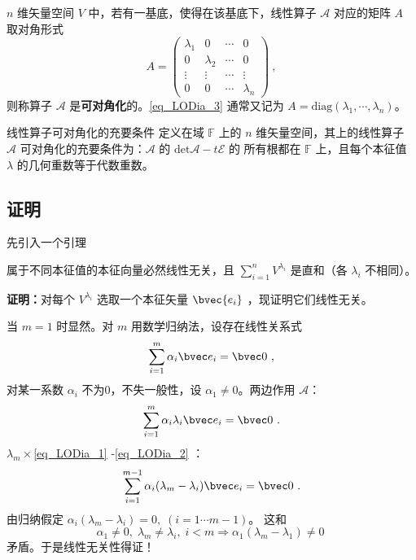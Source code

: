 \begin{definition}{}
 $n$ 维矢量空间 $V$ 中，若有一基底，使得在该基底下，线性算子 $\mathcal{A}$ 对应的矩阵 $A$ 取对角形式
 \begin{equation}\label{eq_LODia_3}
 A=\begin{pmatrix}
 \lambda_1&0&\cdots&0\\
 0&\lambda_2&\cdots&0\\
 \vdots&\vdots&\cdots&\vdots\\
 0&0&\cdots&\lambda_n
 \end{pmatrix}~,
 \end{equation}
 则称算子 $\mathcal{A}$ 是\textbf{可对角化}的。\autoref{eq_LODia_3} 通常又记为 $A=\mathrm{diag}(\lambda_1,\cdots,\lambda_n)$。
\end{definition}
\begin{theorem}{线性算子可对角化的充要条件}\label{the_LODia_1}
定义在域 $\mathbb{F}$ 上的 $n$ 维矢量空间，其上的线性算子 $\mathcal{A}$ 可对角化的充要条件为：$\mathcal{A}$ 的 $\mathrm{det}{\mathcal{A}-t \mathcal{E}}$ 的 所有根都在 $\mathbb{F}$ 上，且每个本征值 $\lambda$ 的几何重数等于代数重数。
\end{theorem}
\subsection{证明}
先引入一个引理
\begin{lemma}{}\label{lem_LODia_1}
属于不同本征值的本征向量必然线性无关，且 $\sum\limits_{i=1}^nV^{\lambda_i}$ 是直和（各 $\lambda_i$ 不相同）。
\end{lemma}
\textbf{证明：}对每个 $V^{\lambda_i}$ 选取一个本征矢量 $\bvec{e_i}$ ，现证明它们线性无关。

当 $m=1$ 时显然。对 $m$ 用数学归纳法，设存在线性关系式
\begin{equation}\label{eq_LODia_1}
\sum_{i=1}^{m}\alpha_i\bvec e_i=\bvec 0~,
\end{equation}
对某一系数 $\alpha_i$ 不为0，不失一般性，设 $\alpha_1\neq0$。两边作用 $\mathcal A$：
\begin{equation}\label{eq_LODia_2}
\sum_{i=1}^m\alpha_i\lambda_i\bvec e_i=\bvec 0~.
\end{equation}
$\lambda_m\times$\autoref{eq_LODia_1} -\autoref{eq_LODia_2} ：
\begin{equation}
\sum_{i=1}^{m-1}\alpha_i(\lambda_m-\lambda_i)\bvec e_i=\bvec 0~.
\end{equation}
由归纳假定 $\alpha_i(\lambda_m-\lambda_i)=0,\;(i=1\cdots m-1)$。 这和
\begin{equation}
\alpha_1\ne0,\;\lambda_m\neq\lambda_i,\;i<m\Rightarrow \alpha_1(\lambda
_m-\lambda_1)\neq0~
\end{equation}
矛盾。于是线性无关性得证！


